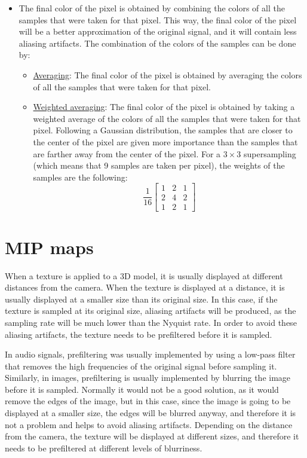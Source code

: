 \begin{itemize}
    \item The final color of the pixel is obtained by combining the colors of all the samples that were taken for that pixel. This way, the final color of the pixel will be a better approximation of the original signal, and it will contain less aliasing artifacts. The combination of the colors of the samples can be done by:
    \begin{itemize}
        \item \ul{Averaging}: The final color of the pixel is obtained by averaging the colors of all the samples that were taken for that pixel.
        \item \ul{Weighted averaging}: The final color of the pixel is obtained by taking a weighted average of the colors of all the samples that were taken for that pixel. Following a Gaussian distribution, the samples that are closer to the center of the pixel are given more importance than the samples that are farther away from the center of the pixel. For a $3\times3$ supersampling (which means that 9 samples are taken per pixel), the weights of the samples are the following:
        \begin{equation*}
            \dfrac{1}{16}\begin{bmatrix}
                1 & 2 & 1 \\
                2 & 4 & 2 \\
                1 & 2 & 1
            \end{bmatrix}
        \end{equation*}
    \end{itemize}
\end{itemize}


\section{MIP maps}\label{sec:mipmaps}

When a texture is applied to a 3D model, it is usually displayed at different distances from the camera. When the texture is displayed at a distance, it is usually displayed at a smaller size than its original size. In this case, if the texture is sampled at its original size, aliasing artifacts will be produced, as the sampling rate will be much lower than the Nyquist rate. In order to avoid these aliasing artifacts, the texture needs to be prefiltered before it is sampled.

In audio signals, prefiltering was usually implemented by using a low-pass filter that removes the high frequencies of the original signal before sampling it. Similarly, in images, prefiltering is usually implemented by blurring the image before it is sampled. Normally it would not be a good solution, as it would remove the edges of the image, but in this case, since the image is going to be displayed at a smaller size, the edges will be blurred anyway, and therefore it is not a problem and helps to avoid aliasing artifacts. Depending on the distance from the camera, the texture will be displayed at different sizes, and therefore it needs to be prefiltered at different levels of blurriness.

